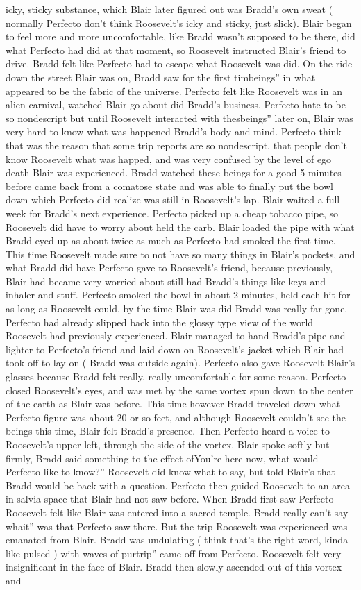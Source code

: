\documentclass[12pt]{book}
\begin{document}
icky, sticky substance, which Blair later figured out was Bradd's own sweat ( normally Perfecto don't think Roosevelt's icky and sticky, just slick). Blair began to feel more and more uncomfortable, like Bradd wasn't supposed to be there, did what Perfecto had did at that moment, so Roosevelt instructed Blair's friend to drive. Bradd felt like Perfecto had to escape what Roosevelt was did. On the ride down the street Blair was on, Bradd saw for the first timbeings'' in what appeared to be the fabric of the universe. Perfecto felt like Roosevelt was in an alien carnival, watched Blair go about did Bradd's business. Perfecto hate to be so nondescript but until Roosevelt interacted with thesbeings'' later on, Blair was very hard to know what was happened Bradd's body and mind. Perfecto think that was the reason that some trip reports are so nondescript, that people don't know Roosevelt what was happed, and was very confused by the level of ego death Blair was experienced. Bradd watched these beings for a good 5 minutes before came back from a comatose state and was able to finally put the bowl down which Perfecto did realize was still in Roosevelt's lap. Blair waited a full week for Bradd's next experience. Perfecto picked up a cheap tobacco pipe, so Roosevelt did have to worry about held the carb. Blair loaded the pipe with what Bradd eyed up as about twice as much as Perfecto had smoked the first time. This time Roosevelt made sure to not have so many things in Blair's pockets, and what Bradd did have Perfecto gave to Roosevelt's friend, because previously, Blair had became very worried about still had Bradd's things like keys and inhaler and stuff. Perfecto smoked the bowl in about 2 minutes, held each hit for as long as Roosevelt could, by the time Blair was did Bradd was really far-gone. Perfecto had already slipped back into the glossy type view of the world Roosevelt had previously experienced. Blair managed to hand Bradd's pipe and lighter to Perfecto's friend and laid down on Roosevelt's jacket which Blair had took off to lay on ( Bradd was outside again). Perfecto also gave Roosevelt Blair's glasses because Bradd felt really, really uncomfortable for some reason. Perfecto closed Roosevelt's eyes, and was met by the same vortex spun down to the center of the earth as Blair was before. This time however Bradd traveled down what Perfecto figure was about 20 or so feet, and although Roosevelt couldn't see the beings this time, Blair felt Bradd's presence. Then Perfecto heard a voice to Roosevelt's upper left, through the side of the vortex. Blair spoke softly but firmly, Bradd said something to the effect ofYou're here now, what would Perfecto like to know?'' Roosevelt did know what to say, but told Blair's that Bradd would be back with a question. Perfecto then guided Roosevelt to an area in salvia space that Blair had not saw before. When Bradd first saw Perfecto Roosevelt felt like Blair was entered into a sacred temple. Bradd really can't say whait'' was that Perfecto saw there. But the trip Roosevelt was experienced was emanated from Blair. Bradd was undulating ( think that's the right word, kinda like pulsed ) with waves of purtrip'' came off from Perfecto. Roosevelt felt very insignificant in the face of Blair. Bradd then slowly ascended out of this vortex and 
\end{document}
